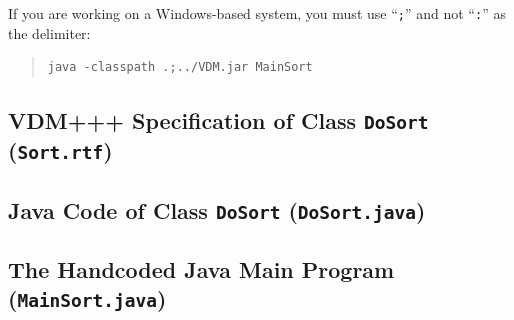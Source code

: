 \documentclass[\pformat,11pt]{article}
\begin{document}
If you are working on a Windows-based system, you must use ``{\tt ;}'' and not ``{\tt :}'' as the delimiter:

\begin{quote}
\begin{verbatim}
java -classpath .;../VDM.jar MainSort
\end{verbatim}
\end{quote}

\subsection{VDM+++ Specification of Class \texttt{DoSort} (\texttt{Sort.rtf})}
\label{sec:vdmDoSort}

\subsection{Java Code of Class \texttt{DoSort} (\texttt{DoSort.java})}
\label{sec:javaDoSort}
\begin{small}
\end{small}

\subsection{The Handcoded Java Main Program (\texttt{MainSort.java})}
\label{sec:main}
\end{document}
